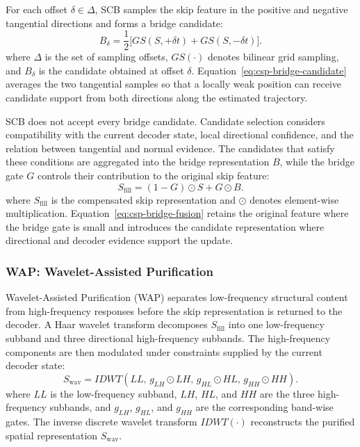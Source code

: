 \documentclass[a4paper,fleqn]{cas-sc}
\begin{document}
For each offset \(\delta \in \Delta\), SCB samples the skip feature in the positive and negative tangential directions and forms a bridge candidate:
\begin{equation}
    B_\delta = \frac{1}{2}\bigl[GS(S, +\delta t) + GS(S, -\delta t)\bigr].
    \label{eq:csp-bridge-candidate}
\end{equation}
where \(\Delta\) is the set of sampling offsets, \(GS(\cdot)\) denotes bilinear grid sampling, and \(B_\delta\) is the candidate obtained at offset \(\delta\).
Equation~\eqref{eq:csp-bridge-candidate} averages the two tangential samples so that a locally weak position can receive candidate support from both directions along the estimated trajectory.

SCB does not accept every bridge candidate.
Candidate selection considers compatibility with the current decoder state, local directional confidence, and the relation between tangential and normal evidence.
The candidates that satisfy these conditions are aggregated into the bridge representation \(B\), while the bridge gate \(G\) controls their contribution to the original skip feature:
\begin{equation}
    S_{\mathrm{fill}} = (1 - G) \odot S + G \odot B.
    \label{eq:csp-bridge-fusion}
\end{equation}
where \(S_{\mathrm{fill}}\) is the compensated skip representation and \(\odot\) denotes element-wise multiplication.
Equation~\eqref{eq:csp-bridge-fusion} retains the original feature where the bridge gate is small and introduces the candidate representation where directional and decoder evidence support the update.

\subsubsection{WAP: Wavelet-Assisted Purification}

Wavelet-Assisted Purification (WAP) separates low-frequency structural content from high-frequency responses before the skip representation is returned to the decoder.
A Haar wavelet transform decomposes \(S_{\mathrm{fill}}\) into one low-frequency subband and three directional high-frequency subbands.
The high-frequency components are then modulated under constraints supplied by the current decoder state:
\begin{equation}
    S_{\mathrm{wav}} = IDWT(LL,\, g_{LH} \odot LH,\, g_{HL} \odot HL,\, g_{HH} \odot HH).
    \label{eq:csp-wavelet-purification}
\end{equation}
where \(LL\) is the low-frequency subband, \(LH\), \(HL\), and \(HH\) are the three high-frequency subbands, and \(g_{LH}\), \(g_{HL}\), and \(g_{HH}\) are the corresponding band-wise gates.
The inverse discrete wavelet transform \(IDWT(\cdot)\) reconstructs the purified spatial representation \(S_{\mathrm{wav}}\).
\end{document}
